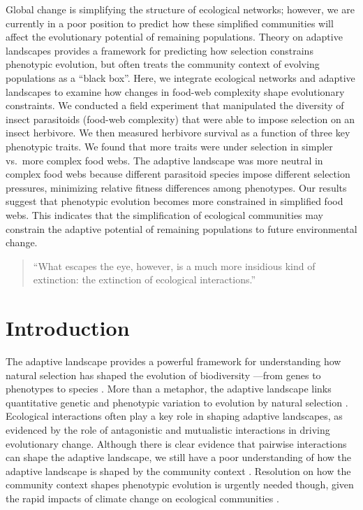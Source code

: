 \documentclass[11pt,]{article}
\begin{document}
Global change is simplifying the structure of ecological networks;
however, we are currently in a poor position to predict how these
simplified communities will affect the evolutionary potential of
remaining populations. Theory on adaptive landscapes provides a
framework for predicting how selection constrains phenotypic evolution,
but often treats the community context of evolving populations as a
``black box''. Here, we integrate ecological networks and adaptive
landscapes to examine how changes in food-web complexity shape
evolutionary constraints. We conducted a field experiment that
manipulated the diversity of insect parasitoids (food-web complexity)
that were able to impose selection on an insect herbivore. We then
measured herbivore survival as a function of three key phenotypic
traits. We found that more traits were under selection in simpler
vs.~more complex food webs. The adaptive landscape was more neutral in
complex food webs because different parasitoid species impose different
selection pressures, minimizing relative fitness differences among
phenotypes. Our results suggest that phenotypic evolution becomes more
constrained in simplified food webs. This indicates that the
simplification of ecological communities may constrain the adaptive
potential of remaining populations to future environmental change.

\newpage

\begin{quote}
``What escapes the eye, however, is a much more insidious kind of
extinction: the extinction of ecological interactions.''
\citet{Janzen1974}
\end{quote}

\section{Introduction}\label{introduction}

The adaptive landscape provides a powerful framework for understanding
how natural selection has shaped the evolution of biodiversity ---from
genes to phenotypes to species
\citep{Wright1931, Simpson1944, Arnold2001}. More than a metaphor, the
adaptive landscape links quantitative genetic and phenotypic variation
to evolution by natural selection
\citep{Lande1979, Arnold1984applications, Arnold1984theory}. Ecological
interactions often play a key role in shaping adaptive landscapes, as
evidenced by the role of antagonistic \citep{Schluter2000, Abrams2000}
and mutualistic \citep{Bronstein2006} interactions in driving
evolutionary change. Although there is clear evidence that pairwise
interactions can shape the adaptive landscape, we still have a poor
understanding of how the adaptive landscape is shaped by the community
context \citep{McPeek2017, terHorst2018}. Resolution on how the
community context shapes phenotypic evolution is urgently needed though,
given the rapid impacts of climate change on ecological communities
\citep{Scheffers2016}.
\end{document}
